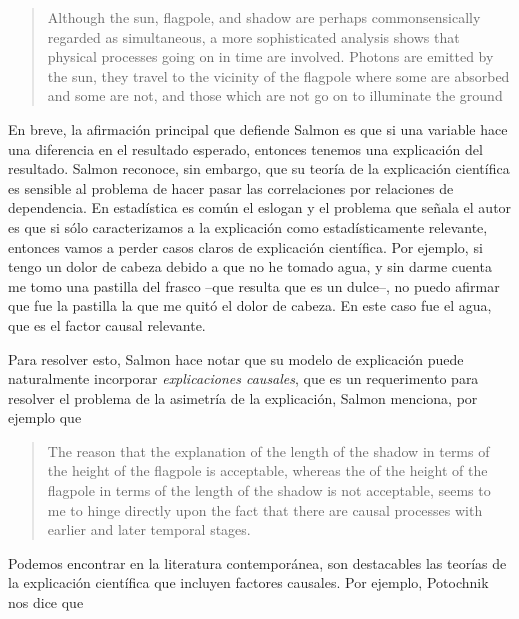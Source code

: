     \begin{quote}
    Although the sun, flagpole, and shadow are perhaps
    commonsensically regarded as simultaneous, a more sophisticated
    analysis shows that physical processes going on in time are
    involved. Photons are emitted by the sun, they travel to the
    vicinity of the flagpole where some are absorbed and some are
    not, and those which are not go on to illuminate the ground
    \end{quote}

En breve, la afirmación principal que defiende Salmon es que si una
variable hace una diferencia en el resultado esperado, entonces
tenemos una explicación del resultado. Salmon reconoce, sin embargo,
que su teoría de la explicación científica es sensible al problema
de hacer pasar las correlaciones por relaciones de dependencia. En
estadística es común el eslogan  y el problema que señala el autor es que si sólo
caracterizamos a la explicación como estadísticamente relevante,
entonces vamos a perder casos claros de explicación científica. Por
ejemplo, si tengo un dolor de cabeza debido a que no he tomado agua,
y sin darme cuenta me tomo una pastilla del frasco --que resulta que
es un dulce--, no puedo afirmar que fue la pastilla la que me quitó
el dolor de cabeza. En este caso fue el agua, que es el factor
causal relevante.

Para resolver esto, Salmon hace notar que su modelo de explicación
puede naturalmente incorporar \emph{explicaciones causales}, que es
un requerimento para resolver el problema de la asimetría de la
explicación, Salmon menciona, por ejemplo que

    \begin{quote}
    The reason that the explanation of the length of the shadow in
    terms of the height of the flagpole is acceptable, whereas the
     of the height of the flagpole in terms of the
    length of the shadow is not acceptable, seems to me to hinge
    directly upon the fact that there are causal processes with
    earlier and later temporal stages.
    \end{quote}

Podemos encontrar en la literatura contemporánea, son destacables
las teorías de la explicación científica que incluyen factores
causales. Por ejemplo, Potochnik nos dice que  \parencite[][p.~24]{Potochnik2017-POTIAT-3}

